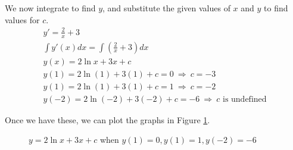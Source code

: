 \begin{enumerate}
		We now integrate to find \(y\), and substitute the given values of \(x\) and \(y\) to find values for \(c\).
		\begin{gather*}
			y'=\frac{2}{x} + 3\\
			\int y'(x) dx = \int \left(\frac{2}{x} + 3\right) dx\\
			y(x) = 2 \ln x + 3x + c\\
			y(1) = 2 \ln (1) + 3(1) + c = 0\ \Rightarrow\ c = -3\\
			y(1) = 2 \ln (1) + 3(1) + c = 1\ \Rightarrow\ c = -2\\
			y(-2) = 2 \ln (-2) + 3(-2) + c = -6\ \Rightarrow\ c \text{ is undefined}
		\end{gather*}

		Once we have these, we can plot the graphs in Figure \ref{q1b4}.
		\begin{figure}[htb]
			\centering
			\caption{\(y = 2 \ln x + 3x + c\) when \(y(1) = 0, y(1) = 1, y(-2) = -6\)}
			\label{q1b4}
		\end{figure}
\end{enumerate}